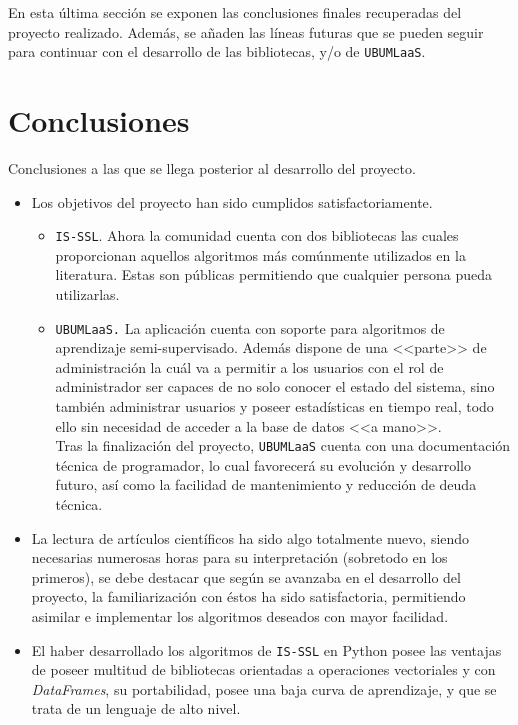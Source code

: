 
En esta última sección se exponen las conclusiones finales recuperadas del proyecto realizado. Además, se añaden las líneas futuras que se pueden seguir para continuar con el desarrollo de las bibliotecas, y/o de \texttt{UBUMLaaS}.

\section{Conclusiones}
Conclusiones a las que se llega posterior al desarrollo del proyecto.

\begin{itemize}
\item Los objetivos del proyecto han sido cumplidos satisfactoriamente.
	\begin{itemize}
	\item \texttt{IS-SSL}. Ahora la comunidad cuenta con dos bibliotecas las cuales proporcionan aquellos algoritmos más comúnmente utilizados en la literatura. Estas son públicas permitiendo que cualquier persona pueda utilizarlas.
	\item \texttt{UBUMLaaS.} La aplicación cuenta con soporte para algoritmos de aprendizaje semi-supervisado. Además dispone de una <<parte>> de administración la cuál va a permitir a los usuarios con el rol de administrador ser capaces de no solo conocer el estado del sistema, sino también administrar usuarios y poseer estadísticas en tiempo real, todo ello sin necesidad de acceder a la base de datos <<a mano>>.\\
	Tras la finalización del proyecto, \texttt{UBUMLaaS} cuenta con una documentación técnica de programador, lo cual favorecerá su evolución y desarrollo futuro, así como la facilidad de mantenimiento y reducción de deuda técnica.
	\end{itemize}
\item La lectura de artículos científicos ha sido algo totalmente nuevo, siendo necesarias numerosas horas para su interpretación (sobretodo en los primeros), se debe destacar que según se avanzaba en el desarrollo del proyecto, la familiarización con éstos ha sido satisfactoria, permitiendo asimilar e implementar los algoritmos deseados con mayor facilidad.
\item El haber desarrollado los algoritmos de \texttt{IS-SSL} en Python posee las ventajas de poseer multitud de bibliotecas orientadas a operaciones vectoriales y con \textit{DataFrames}, su portabilidad, posee una baja curva de aprendizaje, y que se trata de un lenguaje de alto nivel.

\end{itemize}
